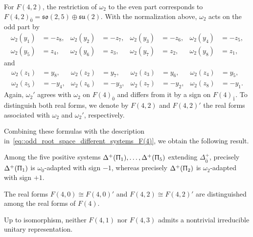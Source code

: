 For $F(4,2)$,  the restriction of $\omega_{2}$ to the even part corresponds to
$
F(4,2)_{\bar0}
=
\mathfrak{so}(2,5)\oplus\mathfrak{su}(2)$. With the normalization above, $\omega_{2}$ acts on the odd part by
\begin{equation}
\begin{aligned}
\omega_2(y_1)&=-z_8,
&
\omega_2(y_2)&=-z_7,
&
\omega_2(y_3)&=-z_6,
&
\omega_2(y_4)&=-z_5,
\\
\omega_2(y_5)&=z_4,
&
\omega_2(y_6)&=z_3,
&
\omega_2(y_7)&=z_2,
&
\omega_2(y_8)&=z_1,
\end{aligned}
\end{equation}
and
\begin{equation}
\begin{aligned}
\omega_2(z_1)&=y_8,
&
\omega_2(z_2)&=y_7,
&
\omega_2(z_3)&=y_6,
&
\omega_2(z_4)&=y_5,
\\
\omega_2(z_5)&=-y_4,
&
\omega_2(z_6)&=-y_3,
&
\omega_2(z_7)&=-y_2,
&
\omega_2(z_8)&=-y_1.
\end{aligned}
\end{equation}
Again, $\omega_2'$ agrees with
$\omega_2$ on $F(4)_{\bar0}$ and differs from it by a sign on
$F(4)_{\bar1}$. To distinguish both real forms, we
denote by $F(4,2)$ and $F(4,2)'$ the real forms associated with
$\omega_2$ and $\omega_2'$, respectively.

Combining these formulas with the description in~\eqref{eq::odd_root_space_different_systems_F(4)}, we obtain the following result.

\begin{lemma}\label{lemm::F4_adapted_positive_systems}
Among the five positive systems $\Delta^{+}(\Uppi_1),\ldots,\Delta^{+}(\Uppi_5)$ extending $\Delta_{\bar0}^{+}$, precisely $\Delta^{+}(\Uppi_1)$ is $\omega_0$-adapted with sign $-1$, whereas precisely $\Delta^{+}(\Uppi_2)$ is $\omega_2$-adapted with sign $+1$.\end{lemma}

The real forms $F(4,0)\cong F(4,0)'$ and $F(4,2)\cong F(4,2)'$ are distinguished among the real forms of $F(4)$.

\begin{lemma}
Up to isomorphism, neither $F(4,1)$ nor $F(4,3)$ admits a nontrivial
irreducible unitary representation.
\end{lemma}

